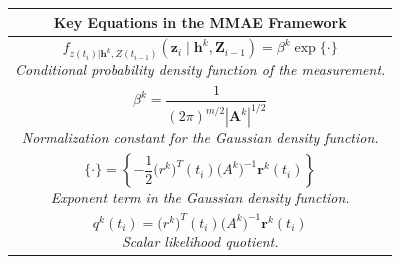 \documentclass[letterpaper, 10 pt, conference]{ieeeconf}  %
\begin{document}
\begin{table}[h]
    \centering
    \small
    \renewcommand{\arraystretch}{1.5}
    \setlength{\tabcolsep}{4pt} %
    \begin{tabular}{|c|}
        \hline
        \textbf{Key Equations in the MMAE Framework} \\
        \hline
        \begin{minipage}{0.95\linewidth} %
            \begin{equation} 
                f_{z(t_i) | \mathbf{h}^k, Z(t_{i-1})} (\mathbf{z}_i \mid \mathbf{h}^k, \mathbf{Z}_{i-1}) = \beta^k \exp\{\cdot\} 
                \tag{13}
            \end{equation}
            \centering \textit{Conditional probability density function of the measurement.}
        \end{minipage} \\
        \hline
        \begin{minipage}{0.95\linewidth}
            \begin{equation} 
                \beta^k = \frac{1}{(2\pi)^{m/2} |\mathbf{A}^k|^{1/2}} 
                \tag{14}
            \end{equation}
            \centering \textit{Normalization constant for the Gaussian density function.}
        \end{minipage} \\
        \hline
        \begin{minipage}{0.95\linewidth}
            \begin{equation} 
                \{ \cdot \} = \left\{ -\frac{1}{2} \mathbf({r^k})^T (t_i) \mathbf({A}^k)^{-1} \mathbf{r}^k (t_i) \right\} 
                \tag{15}
            \end{equation}
            \centering \textit{Exponent term in the Gaussian density function.}
        \end{minipage} \\
        \hline
        \begin{minipage}{0.95\linewidth}
            \begin{equation} 
                q^k (t_i) = \mathbf({r}^k)^T (t_i) \mathbf({A}^k)^{-1} \mathbf{r}^k (t_i) 
                \tag{16}
            \end{equation}
            \centering \textit{Scalar likelihood quotient.}
        \end{minipage} \\
        \hline

\end{tabular}
\end{table}
\end{document}
